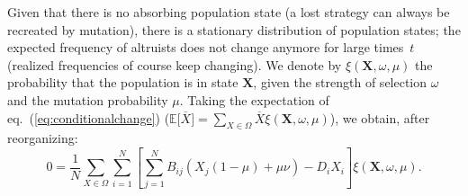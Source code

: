 \documentclass[11pt, letterpaper]{article}
\renewcommand{\eqref}[1]{\textup{{\normalfont eq.~(\ref{#1}}\normalfont)}}
\newcommand{\Esp}[1]{\mathbb{E}\big[ #1\big]}%
\newcommand{\mutbias}{\nu}
\begin{document}
Given that there is no absorbing population state (a lost strategy can always be recreated by mutation), there is a stationary distribution of population states; the expected frequency of altruists does not change anymore for large times~$t$ (realized frequencies of course keep changing). We denote by $\xi(\mathbf{X}, \omega, \mu)$ the probability that the population is in state $\mathbf{X}$, given the strength of selection $\omega$ and the mutation probability $\mu$. Taking the expectation of \eqref{eq:conditionalchange} ($\Esp{\overline{X}} = \sum_{X \in \Omega} \overline{X}\xi(\mathbf{X}, \omega, \mu)$), we obtain, after reorganizing:
\begin{equation}\label{eq:statdist}
0 = \frac{1}{N} \sum_{X\in \Omega} \sum_{i=1}^N \left[ \sum_{j=1}^N B_{ij} \left( X_j (1-\mu) + \mu \mutbias \right) -D_i X_i \right] \xi(\mathbf{X}, \omega, \mu). 
\end{equation}
\end{document}
